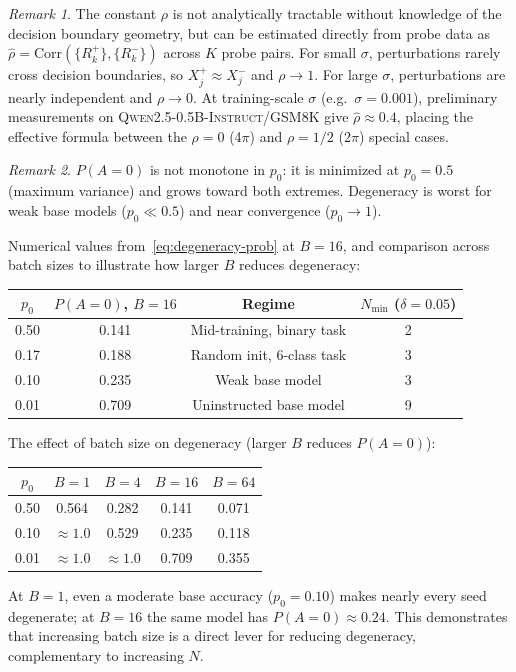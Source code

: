 \documentclass[11pt]{article}
\theoremstyle{definition}
\theoremstyle{remark}
\newtheorem{remark}{Remark}
\newcommand{\Nmin}{N_{\mathrm{min}}}
\begin{document}
\begin{remark}
The constant $\rho$ is not analytically tractable without knowledge of the decision boundary geometry, but can be estimated directly from probe data as $\hat\rho = \mathrm{Corr}(\{R^+_k\}, \{R^-_k\})$ across $K$ probe pairs. For small $\sigma$, perturbations rarely cross decision boundaries, so $X^+_j \approx X^-_j$ and $\rho \to 1$. For large $\sigma$, perturbations are nearly independent and $\rho \to 0$. At training-scale $\sigma$ (e.g.\ $\sigma = 0.001$), preliminary measurements on \textsc{Qwen2.5-0.5B-Instruct}/GSM8K give $\hat\rho \approx 0.4$, placing the effective formula between the $\rho=0$ (4$\pi$) and $\rho=1/2$ (2$\pi$) special cases.
\end{remark}

\begin{remark}
$P(A=0)$ is not monotone in $p_0$: it is minimized at $p_0 = 0.5$ (maximum variance) and grows toward both extremes. Degeneracy is worst for weak base models ($p_0 \ll 0.5$) and near convergence ($p_0 \to 1$).
\end{remark}

Numerical values from~\eqref{eq:degeneracy-prob} at $B=16$, and comparison across batch sizes to illustrate how larger $B$ reduces degeneracy:

\begin{center}
\begin{tabular}{cccc}
\toprule
$p_0$ & $P(A=0)$, $B=16$ & Regime & $\Nmin$ ($\delta=0.05$)\\
\midrule
0.50 & 0.141 & Mid-training, binary task & 2\\
0.17 & 0.188 & Random init, 6-class task & 3\\
0.10 & 0.235 & Weak base model & 3\\
0.01 & 0.709 & Uninstructed base model & 9\\
\bottomrule
\end{tabular}
\end{center}

\medskip
The effect of batch size on degeneracy (larger $B$ reduces $P(A=0)$):

\begin{center}
\begin{tabular}{ccccc}
\toprule
$p_0$ & $B=1$ & $B=4$ & $B=16$ & $B=64$\\
\midrule
0.50 & 0.564 & 0.282 & 0.141 & 0.071\\
0.10 & $\approx 1.0$ & 0.529 & 0.235 & 0.118\\
0.01 & $\approx 1.0$ & $\approx 1.0$ & 0.709 & 0.355\\
\bottomrule
\end{tabular}
\end{center}
\noindent At $B=1$, even a moderate base accuracy ($p_0=0.10$) makes nearly every seed degenerate; at $B=16$ the same model has $P(A=0) \approx 0.24$. This demonstrates that increasing batch size is a direct lever for reducing degeneracy, complementary to increasing $N$.
\end{document}
